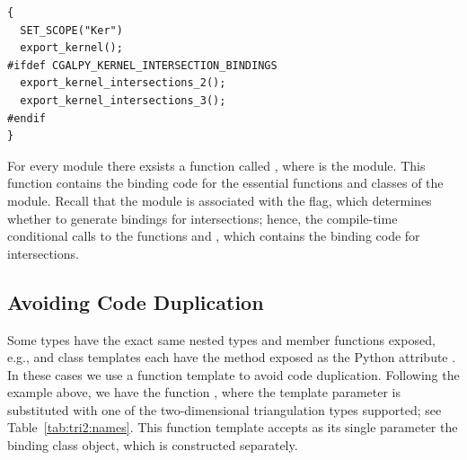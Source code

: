 \begin{lstlisting}[style=cppNumberedStyle]
{
  SET_SCOPE("Ker")
  export_kernel();
#ifdef CGALPY_KERNEL_INTERSECTION_BINDINGS
  export_kernel_intersections_2();
  export_kernel_intersections_3();
#endif
}
\end{lstlisting}

For every module there exsists a function called
, where  is the
module. This function contains the binding code for the essential
functions and classes of the module. Recall that the
\iiDandiiiDGeometryKernelPackage{} module is associated with the
 flag, which determines
whether to generate bindings for intersections; hence, the
compile-time conditional calls to the functions
 and
, which contains the
binding code for intersections.


\subsection{Avoiding Code Duplication}
\label{sec:code:templates}
Some types have the exact same nested types and member functions
exposed, e.g.,  and
 class templates each have
the method  exposed as the Python attribute
. In these cases we use a function template to
avoid code duplication. Following the example above, we have the
function ,
where the template parameter  is
substituted with one of the two-dimensional triangulation types
supported; see Table~\ref{tab:tri2:names}. This function template
accepts as its single parameter the binding class object, which is
constructed separately.

